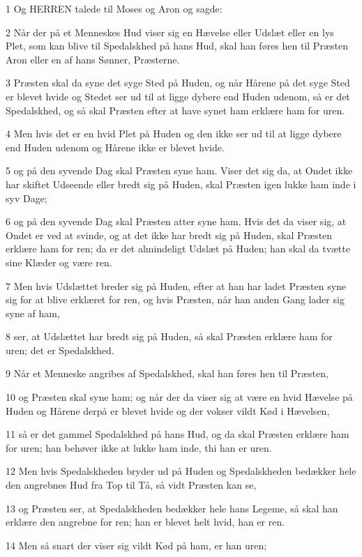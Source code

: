 \par 1 Og HERREN talede til Moses og Aron og sagde:
\par 2 Når der på et Menneskes Hud viser sig en Hævelse eller Udslæt eller en lys Plet, som kan blive til Spedalskhed på hans Hud, skal han føres hen til Præsten Aron eller en af hans Sønner, Præsterne.
\par 3 Præsten skal da syne det syge Sted på Huden, og når Hårene på det syge Sted er blevet hvide og Stedet ser ud til at ligge dybere end Huden udenom, så er det Spedalskhed, og så skal Præsten efter at have synet ham erklære ham for uren.
\par 4 Men hvis det er en hvid Plet på Huden og den ikke ser ud til at ligge dybere end Huden udenom og Hårene ikke er blevet hvide.
\par 5 og på den syvende Dag skal Præsten syne ham. Viser det sig da, at Ondet ikke har skiftet Udseende eller bredt sig på Huden, skal Præsten igen lukke ham inde i syv Dage;
\par 6 og på den syvende Dag skal Præsten atter syne ham. Hvis det da viser sig, at Ondet er ved at svinde, og at det ikke har bredt sig på Huden, skal Præsten erklære ham for ren; da er det almindeligt Udslæt på Huden; han skal da tvætte sine Klæder og være ren.
\par 7 Men hvis Udslættet breder sig på Huden, efter at han har ladet Præsten syne sig for at blive erklæret for ren, og hvis Præsten, når han anden Gang lader sig syne af ham,
\par 8 ser, at Udslættet har bredt sig på Huden, så skal Præsten erklære ham for uren; det er Spedalskhed.
\par 9 Når et Menneske angribes af Spedalskhed, skal han føres hen til Præsten,
\par 10 og Præsten skal syne ham; og når der da viser sig at være en hvid Hævelse på Huden og Hårene derpå er blevet hvide og der vokser vildt Kød i Hævelsen,
\par 11 så er det gammel Spedalskhed på hans Hud, og da skal Præsten erklære ham for uren; han behøver ikke at lukke ham inde, thi han er uren.
\par 12 Men hvis Spedalskheden bryder ud på Huden og Spedalskheden bedækker hele den angrebnes Hud fra Top til Tå, så vidt Præsten kan se,
\par 13 og Præsten ser, at Spedalskheden bedækker hele hans Legeme, så skal han erklære den angrebne for ren; han er blevet helt hvid, han er ren.
\par 14 Men så snart der viser sig vildt Kød på ham, er han uren;
